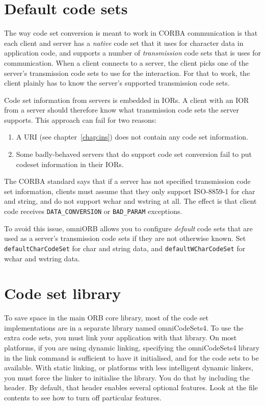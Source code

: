 \documentclass[11pt,oneside,a4paper]{book}
\newcommand{\code}[1]{\texttt{#1}}
\newcommand{\term}[1]{\textit{#1}}
\begin{document}
\section{Default code sets}

The way code set conversion is meant to work in CORBA communication is
that each client and server has a \term{native} code set that it uses
for character data in application code, and supports a number of
\term{transmission} code sets that is uses for communication. When a
client connects to a server, the client picks one of the server's
transmission code sets to use for the interaction. For that to work,
the client plainly has to know the server's supported transmission
code sets.

Code set information from servers is embedded in IORs. A client with
an IOR from a server should therefore know what transmission code sets
the server supports. This approach can fail for two reasons:

\begin{enumerate}
  \item A  URI (see chapter~\ref{chap:ins}) does
    not contain any code set information.

  \item Some badly-behaved servers that do support code set conversion
    fail to put codeset information in their IORs.
\end{enumerate}

The CORBA standard says that if a server has not specified
transmission code set information, clients must assume that they only
support ISO-8859-1 for char and string, and do not support wchar and
wstring at all. The effect is that client code receives
\code{DATA\_CONVERSION} or \code{BAD\_PARAM} exceptions.

To avoid this issue, omniORB allows you to configure \term{default}
code sets that are used as a server's transmission code sets if they
are not otherwise known. Set \code{defaultCharCodeSet} for char and
string data, and \code{defaultWCharCodeSet} for wchar and wstring data.


\section{Code set library}

To save space in the main ORB core library, most of the code set
implementations are in a separate library named omniCodeSets4. To use
the extra code sets, you must link your application with that
library. On most platforms, if you are using dynamic linking,
specifying the omniCodeSets4 library in the link command is sufficient
to have it initialised, and for the code sets to be available. With
static linking, or platforms with less intelligent dynamic linkers,
you must force the linker to initialise the library. You do that by
including the  header. By default,
that header enables several optional features. Look at the file
contents to see how to turn off particular features.
\end{document}
